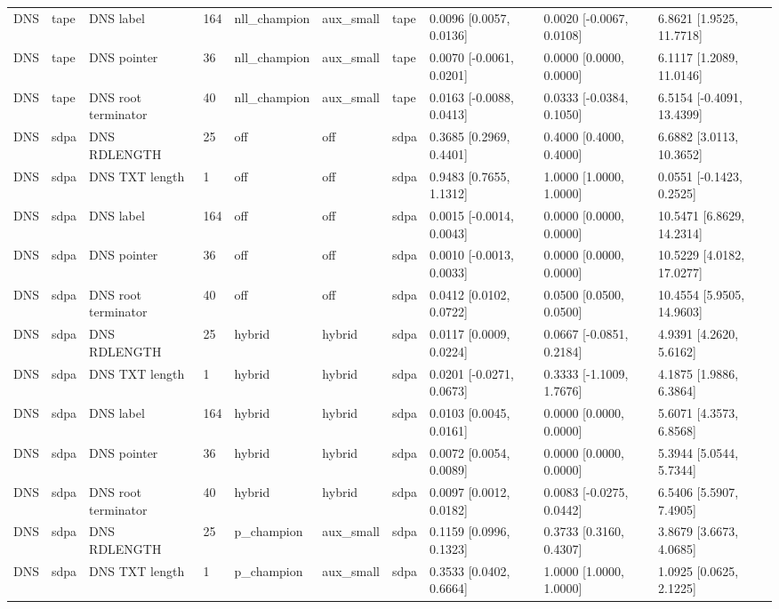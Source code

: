 \begin{tabular}{llllllllll}
DNS & tape & DNS label & 164 & nll\_champion & aux\_small & tape & 0.0096 [0.0057, 0.0136] & 0.0020 [-0.0067, 0.0108] & 6.8621 [1.9525, 11.7718] \\
DNS & tape & DNS pointer & 36 & nll\_champion & aux\_small & tape & 0.0070 [-0.0061, 0.0201] & 0.0000 [0.0000, 0.0000] & 6.1117 [1.2089, 11.0146] \\
DNS & tape & DNS root terminator & 40 & nll\_champion & aux\_small & tape & 0.0163 [-0.0088, 0.0413] & 0.0333 [-0.0384, 0.1050] & 6.5154 [-0.4091, 13.4399] \\
DNS & sdpa & DNS RDLENGTH & 25 & off & off & sdpa & 0.3685 [0.2969, 0.4401] & 0.4000 [0.4000, 0.4000] & 6.6882 [3.0113, 10.3652] \\
DNS & sdpa & DNS TXT length & 1 & off & off & sdpa & 0.9483 [0.7655, 1.1312] & 1.0000 [1.0000, 1.0000] & 0.0551 [-0.1423, 0.2525] \\
DNS & sdpa & DNS label & 164 & off & off & sdpa & 0.0015 [-0.0014, 0.0043] & 0.0000 [0.0000, 0.0000] & 10.5471 [6.8629, 14.2314] \\
DNS & sdpa & DNS pointer & 36 & off & off & sdpa & 0.0010 [-0.0013, 0.0033] & 0.0000 [0.0000, 0.0000] & 10.5229 [4.0182, 17.0277] \\
DNS & sdpa & DNS root terminator & 40 & off & off & sdpa & 0.0412 [0.0102, 0.0722] & 0.0500 [0.0500, 0.0500] & 10.4554 [5.9505, 14.9603] \\
DNS & sdpa & DNS RDLENGTH & 25 & hybrid & hybrid & sdpa & 0.0117 [0.0009, 0.0224] & 0.0667 [-0.0851, 0.2184] & 4.9391 [4.2620, 5.6162] \\
DNS & sdpa & DNS TXT length & 1 & hybrid & hybrid & sdpa & 0.0201 [-0.0271, 0.0673] & 0.3333 [-1.1009, 1.7676] & 4.1875 [1.9886, 6.3864] \\
DNS & sdpa & DNS label & 164 & hybrid & hybrid & sdpa & 0.0103 [0.0045, 0.0161] & 0.0000 [0.0000, 0.0000] & 5.6071 [4.3573, 6.8568] \\
DNS & sdpa & DNS pointer & 36 & hybrid & hybrid & sdpa & 0.0072 [0.0054, 0.0089] & 0.0000 [0.0000, 0.0000] & 5.3944 [5.0544, 5.7344] \\
DNS & sdpa & DNS root terminator & 40 & hybrid & hybrid & sdpa & 0.0097 [0.0012, 0.0182] & 0.0083 [-0.0275, 0.0442] & 6.5406 [5.5907, 7.4905] \\
DNS & sdpa & DNS RDLENGTH & 25 & p\_champion & aux\_small & sdpa & 0.1159 [0.0996, 0.1323] & 0.3733 [0.3160, 0.4307] & 3.8679 [3.6673, 4.0685] \\
DNS & sdpa & DNS TXT length & 1 & p\_champion & aux\_small & sdpa & 0.3533 [0.0402, 0.6664] & 1.0000 [1.0000, 1.0000] & 1.0925 [0.0625, 2.1225] \\

\end{tabular}

